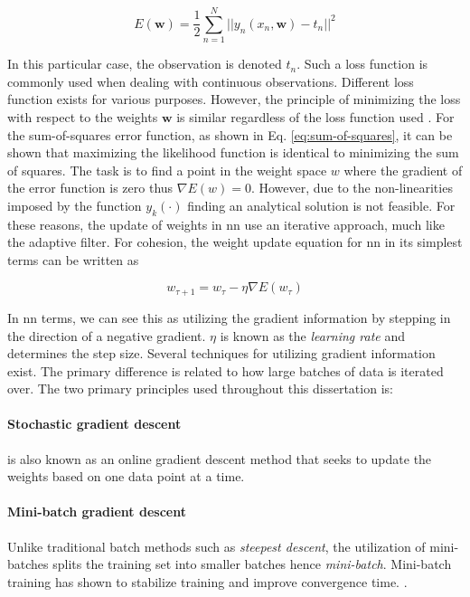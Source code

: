 \begin{equation}\label{eq:sum-of-squares}
  E(\mathbf{w}) = \frac{1}{2}\sum_{n=1}^N ||y_n(x_n,\mathbf{w}) - t_n ||^2
\end{equation}

In this particular case, the observation is denoted $t_n$. Such a loss function is commonly used when dealing with continuous observations. Different loss function exists for various purposes. However, the principle of minimizing the loss with respect to the weights $\mathbf{w}$ is similar regardless of the loss function used \cite{M.Bishop2006}. For the sum-of-squares error function, as shown in Eq. \ref{eq:sum-of-squares}, it can be shown that maximizing the likelihood function is identical to minimizing the sum of squares. The task is to find a point in the weight space $w$ where the gradient of the error function is zero thus $\nabla E(w) = 0$. However, due to the non-linearities imposed by the function $y_k(\cdot)$ finding an analytical solution is not feasible. For these reasons, the update of weights in \gls{nn} use an iterative approach, much like the adaptive filter. For cohesion, the weight update equation for \gls{nn} in its simplest terms can be written as

\begin{equation}\label{eq:weight_update}
    w_{\tau + 1} = w_{\tau} - \eta \nabla E(w_{\tau})
\end{equation}

In \gls{nn} terms, we can see this as utilizing the gradient information by stepping in the direction of a negative gradient. $\eta$ is known as the \emph{learning rate} and determines the step size. Several techniques for utilizing gradient information exist. The primary difference is related to how large batches of data is iterated over. The two primary principles used throughout this dissertation is:

\paragraph{Stochastic gradient descent}
is also known as an online gradient descent method that seeks to update the weights based on one data point at a time.

\paragraph{Mini-batch gradient descent}
Unlike traditional batch methods such as \emph{steepest descent}, the utilization of mini-batches splits the training set into smaller batches hence \emph{mini-batch}. Mini-batch training has shown to stabilize training and improve convergence time. \cite{Nielsen2015}.

